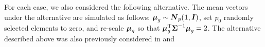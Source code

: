 \documentclass[pdflatex,sn-basic]{sn-jnl}%
\def\trace{\hbox{trace}}
\def\trace{\hbox{trace}}
\def\trans{^{\rm T}}
\newcommand{\uI}       {\mbox{\boldmath$I$}}
\newcommand{\uN}       {\mbox{\boldmath$N$}}
\newcommand{\umu}               {\mbox{\boldmath$\mu$}}
\newcommand{\uSigma}            {\mbox{\boldmath$\Sigma$}}
\theoremstyle{thmstyleone}%
\theoremstyle{thmstyletwo}%
\theoremstyle{thmstylethree}%
\begin{document}
For each case, we also considered the following alternative. The mean vectors under the alternative are simulated as follows:
 $\umu_g \sim \uN_{p}(\bf{1}, \uI)$, set $p_0$ randomly selected elements to zero, and re-scale $\umu_g$ so that $\umu_g \trans\uSigma ^{-1}  \umu_g = 2$.
The alternative described above was also previously considered in \cite{srivastava2014raptt} and \cite{zoh2018powerful} %
\end{document}
